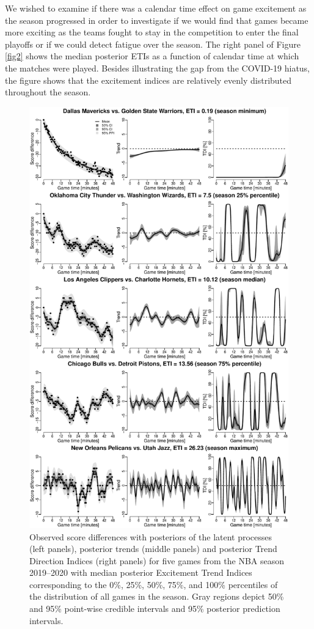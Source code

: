 \documentclass[
  11pt,
]{svjour3}
\theoremstyle{nonumberplain}
\begin{document}
We wished to examine if there was a calendar time effect on game
excitement as the season progressed in order to investigate if we would
find that games became more exciting as the teams fought to stay in the
competition to enter the final playoffs or if we could detect fatigue
over the season. The right panel of Figure \ref{fig2} shows the median
posterior ETIs as a function of calendar time at which the matches were
played. Besides illustrating the gap from the COVID-19 hiatus, the
figure shows that the excitement indices are relatively evenly
distributed throughout the season.

\begin{figure}[htbp]
\includegraphics{fig4.pdf}
\caption{Observed score differences with posteriors of the latent processes (left panels), posterior trends (middle panels) and posterior Trend Direction Indices (right panels) for five games from the NBA season 2019--2020 with median posterior Excitement Trend Indices corresponding to the 0\%, 25\%, 50\%, 75\%, and 100\% percentiles of the distribution of all games in the season. Gray regions depict 50\% and 95\% point-wise credible intervals and 95\% posterior prediction intervals.}
\label{fig3}
\end{figure}
\end{document}

